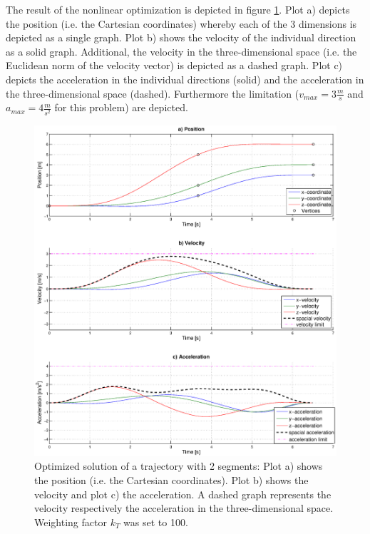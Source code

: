 
The result of the nonlinear optimization is depicted in figure \ref{pic:optimizedSolution}. Plot a) depicts the position (i.e. the Cartesian coordinates) whereby each of the 3 dimensions is depicted as a single graph. Plot b) shows the velocity of the individual direction as a solid graph. Additional, the velocity in the three-dimensional space (i.e. the Euclidean norm of the velocity vector) is depicted as a dashed graph. Plot c) depicts the acceleration in the individual directions (solid) and the acceleration in the three-dimensional space (dashed). Furthermore the limitation ($v_{max} = 3 \frac{m}{s}$ and $a_{max} = 4 \frac{m}{s^2}$ for this problem) are depicted.

\begin{figure}[h]
   \centering
   \includegraphics[trim = 35mm 20mm 30mm 8mm,clip,width=1\textwidth]{pics/2SegOpti6s52k100.eps}
   \caption{Optimized solution of a trajectory with 2 segments: Plot a) shows the position (i.e. the Cartesian coordinates). Plot b) shows the velocity and plot c) the acceleration. A dashed graph represents the velocity respectively the acceleration in the three-dimensional space. Weighting factor $k_T$ was set to 100.}
   \label{pic:optimizedSolution}
\end{figure}



